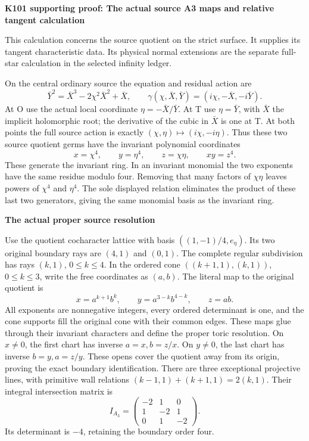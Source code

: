 \par\bigskip\noindent\textbf{K101 supporting proof: The actual source A3 maps and relative tangent calculation}\par\nobreak
This calculation concerns the source quotient on the strict surface.
It supplies its tangent characteristic data. Its physical normal
extensions are the separate full-star calculation in the selected
infinity ledger.

On the central ordinary source the equation and residual action are
\[
 \bar Y^2=\bar X^3-2\chi^2\bar X^2+\bar X,
 \qquad
 \gamma(\chi,\bar X,\bar Y)=(i\chi,-\bar X,-i\bar Y).
\]
At O use the actual local coordinate \(\eta=-\bar X/\bar Y\).
At T use \(\eta=\bar Y\), with \(\bar X\) the implicit
holomorphic root; the derivative of the cubic in \(\bar X\)
is one at T. At both points the full source action is exactly
\((\chi,\eta)\mapsto(i\chi,-i\eta)\). Thus these two
source quotient germs have the invariant polynomial coordinates
\[
 x=\chi^4,\qquad y=\eta^4,\qquad z=\chi\eta,
 \qquad xy=z^4.
\]
These generate the invariant ring. In an invariant monomial the
two exponents have the same residue modulo four. Removing that
many factors of \(\chi\eta\) leaves powers of \(\chi^4\)
and \(\eta^4\). The sole displayed relation eliminates the
product of these last two generators, giving the same monomial
basis as the invariant ring.

\par

\medskip\noindent\textbf{The actual proper source resolution}

\par\nobreak

Use the quotient cocharacter lattice with basis
\(((1,-1)/4,e_\eta)\). Its two original boundary rays are
\((4,1)\) and \((0,1)\). The complete regular subdivision
has rays \((k,1)\), \(0\le k\le4\). In the ordered cone
\(((k+1,1),(k,1))\), \(0\le k\le3\), write the free
coordinates as \((a,b)\). The literal map to the original
quotient is
\[
 x=a^{k+1}b^k,\qquad
 y=a^{3-k}b^{4-k},\qquad z=ab.
\tag{ASa}
\]
All exponents are nonnegative integers, every ordered determinant
is one, and the cone supports fill the original cone with their
common edges. These maps glue through their invariant characters
and define the proper toric resolution. On \(x\ne0\), the
first chart has inverse \(a=x,b=z/x\). On \(y\ne0\), the
last chart has inverse \(b=y,a=z/y\). These opens cover the
quotient away from its origin, proving the exact boundary
identification. There are three exceptional projective lines,
with primitive wall relations
\((k-1,1)+(k+1,1)=2(k,1)\). Their integral intersection matrix is
\[
 I_{A_3}=\begin{pmatrix}-2&1&0\\1&-2&1\\0&1&-2\end{pmatrix}.
\tag{ASb}
\]
Its determinant is \(-4\), retaining the boundary order four.

